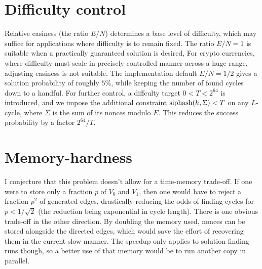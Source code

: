 \documentclass[11pt, oneside]{article}
\newcommand{\hash}{{\rm siphash}}
\begin{document}
\begin{center}
\end{center}

\section{Difficulty control}
Relative easiness (the ratio $E/N$) determines a base level of difficulty,
which may suffice for applications where difficulty is to remain fixed.
The ratio $E/N=1$ is suitable when a practically guaranteed solution is desired,
For crypto currencies, where difficulty must scale in precisely
controlled manner across a huge range, adjusting easiness is not suitable.
The implementation default $E/N=1/2$ gives a solution probability of roughly $5\%$,
while keeping the number of found cycles down to a handful.
For further control, a diffculty target $0 < T < 2^{64}$ is introduced,
and we impose the additional constraint $\hash(h,\Sigma) < T$
on any $L$-cycle, where $\Sigma$ is the sum of its nonces modulo $E$.
This reduces the success probability by a factor $2^{64}/T$.

\section{Memory-hardness}
I conjecture that this problem doesn't allow for a time-memory trade-off. If
one were to store only a fraction $p$ of $V_0$ and $V_1$, then one would have
to reject a fraction $p^2$ of generated edges, drastically reducing the odds of
finding cycles for $p<1/\sqrt{2}$ (the reduction being exponential in cycle length).
There is one obvious trade-off in the other direction. By doubling the memory
used, nonces can be stored alongside the directed edges, which would save the
effort of recovering them in the current slow manner. The speedup only
applies to solution finding runs though, so a better use of that memory would be to run
another copy in parallel.
\end{document}
